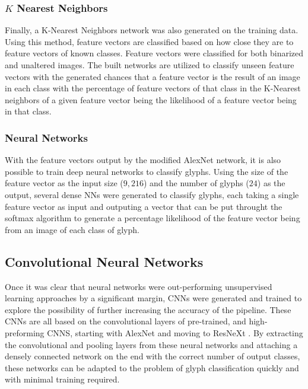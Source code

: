 \subsubsection{$K$ Nearest Neighbors}

Finally, a K-Nearest Neighbors network was also generated on the training data. Using this method, feature vectors are classified based on how close they are to feature vectors of known classes. Feature vectors were classified for both binarized and unaltered images. The built networks are utilized to classify unseen feature vectors with the generated chances that a feature vector is the result of an image in each class with the percentage of feature vectors of that class in the K-Nearest neighbors of a given feature vector being the likelihood of a feature vector being in that class.

\subsubsection{Neural Networks}

With the feature vectors output by the modified AlexNet network, it is also possible to train deep neural networks to classify glyphs. Using the size of the feature vector as the input size ($9,216$) and the number of glyphs ($24$) as the output, several dense NNs were generated to classify glyphs, each taking a single feature vector as input and outputing a vector that can be put throught the softmax algorithm to generate a percentage likelihood of the feature vector being from an image of each class of glyph.

\subsection{Convolutional Neural Networks}

Once it was clear that neural networks were out-performing unsupervised learning approaches by a significant margin, CNNs were generated and trained to explore the possibility of further increasing the accuracy of the pipeline. These CNNs are all based on the convolutional layers of pre-trained, and high-preforming CNNS, starting with AlexNet \cite{Krizhevsky} and moving to ResNeXt \cite{Xie}. By extracting the convolutional and pooling layers from these neural networks and attaching a densely connected network on the end with the correct number of output classes, these networks can be adapted to the problem of glyph classification quickly and with minimal training required.

